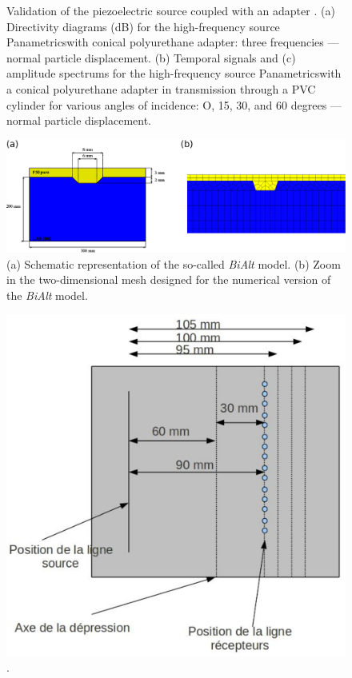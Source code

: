 \documentclass[manuscript,revised]{geophysics}
\begin{document}
\begin{figure}[!ht]
	\caption{Validation of the piezoelectric source coupled with an adapter \citep{Bretaudeau_SSM_2011}. (a) Directivity diagrams (dB) for the high-frequency source Panametrics\textregistered with conical polyurethane adapter: three frequencies — normal particle displacement. (b) Temporal signals and (c) amplitude spectrums for the high-frequency source Panametrics\textregistered with a conical polyurethane adapter in transmission through a PVC cylinder for	various angles of incidence: O, 15, 30, and 60 degrees — normal particle displacement.}
	\label{piezo-source-validation}
\end{figure}

\begin{figure}[!h]
	\centering
	\includegraphics[scale=0.4]{fig/panel_bialt_model.eps}
	\caption{(a) Schematic representation of the so-called \textit{BiAlt} model. (b) Zoom in the two-dimensional mesh designed for the numerical version of the \textit{BiAlt} model.}
	\label{panel_bialt_model}
\end{figure}

\begin{figure}[!h]
	\centering
	\includegraphics[scale=0.4]{fig/amplitude_acqui_principle.eps}
	\caption{.}
	\label{amplitude_acqui_principle}
\end{figure}
\end{document}
